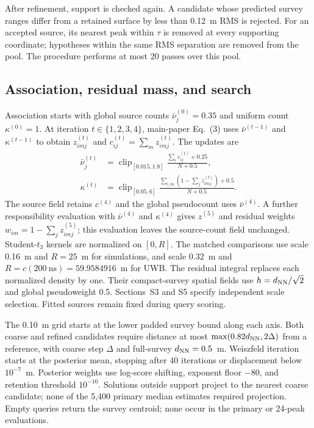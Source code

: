 \documentclass[10pt]{article}
\begin{document}
After refinement, support is checked again. A candidate whose predicted survey ranges differ from a retained surface by less than 0.12~m RMS is rejected. For an accepted source, its nearest peak within $\tau$ is removed at every supporting coordinate; hypotheses within the same RMS separation are removed from the pool. The procedure performs at most 20 passes over this pool.

\subsection{Association, residual mass, and search}
Association starts with global source counts $\bar\nu_j^{(0)}=0.35$ and uniform count $\kappa^{(0)}=1$. At iteration $t\in\{1,2,3,4\}$, main-paper Eq.~(3) uses $\bar\nu^{(t-1)}$ and $\kappa^{(t-1)}$ to obtain $z_{imj}^{(t)}$ and $c_{ij}^{(t)}=\sum_mz_{imj}^{(t)}$. The updates are
\begin{align}
\bar\nu_j^{(t)}&=\operatorname{clip}_{[0.015,1.8]}
\frac{\sum_i c_{ij}^{(t)}+0.25}{N+0.5},\\
\kappa^{(t)}&=\operatorname{clip}_{[0.05,6]}
\frac{\sum_{i,m}(1-\sum_jz_{imj}^{(t)})+0.5}{N+0.5}.
\end{align}
The source field retains $c^{(4)}$ and the global pseudocount uses $\bar\nu^{(4)}$. A further responsibility evaluation with $\bar\nu^{(4)}$ and $\kappa^{(4)}$ gives $z^{(5)}$ and residual weights $w_{im}=1-\sum_jz_{imj}^{(5)}$; this evaluation leaves the source-count field unchanged. Student-$t_3$ kernels are normalized on $[0,R]$. The matched comparisons use scale 0.16~m and $R=25$~m for simulations, and scale 0.32~m and $R=c(200~\mathrm{ns})=59.9584916$~m for UWB. The residual integral replaces each normalized density by one. Their compact-survey spatial fields use $h=d_{\rm NN}/\sqrt2$ and global pseudoweight 0.5. Sections~S3 and S5 specify independent scale selection. Fitted sources remain fixed during query scoring.

The 0.10~m grid starts at the lower padded survey bound along each axis. Both coarse and refined candidates require distance at most $\max(0.82d_{\rm NN},2\Delta)$ from a reference, with coarse step $\Delta$ and full-survey $d_{\rm NN}=0.5$~m. Weiszfeld iteration starts at the posterior mean, stopping after 40 iterations or displacement below $10^{-7}$~m. Posterior weights use log-score shifting, exponent floor $-80$, and retention threshold $10^{-10}$. Solutions outside support project to the nearest coarse candidate; none of the 5,400 primary median estimates required projection. Empty queries return the survey centroid; none occur in the primary or 24-peak evaluations.
\end{document}
